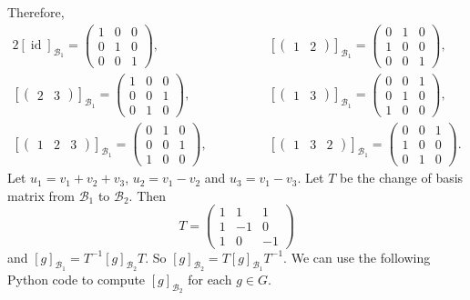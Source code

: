 \documentclass[a4paper, 12pt]{article}
\DeclareMathOperator{\id}{id}
\newcommand{\mc}[1]{\mathcal{#1}}
\begin{document}
Therefore,
\begin{alignat*}{2}
    [\id]_{\mc{B}_1} = \begin{pmatrix} 1&0&0 \\ 0&1&0 \\ 0&0&1 \end{pmatrix}, & \hspace{4em} [\begin{pmatrix} 1&2 \end{pmatrix}]_{\mc{B}_1} = \begin{pmatrix} 0&1&0 \\ 1&0&0 \\ 0&0&1 \end{pmatrix}, \\
    [\begin{pmatrix} 2&3 \end{pmatrix}]_{\mc{B}_1} = \begin{pmatrix} 1&0&0 \\ 0&0&1 \\ 0&1&0 \end{pmatrix}, & \hspace{4em} [\begin{pmatrix} 1&3 \end{pmatrix}]_{\mc{B}_1} = \begin{pmatrix} 0&0&1 \\ 0&1&0 \\ 1&0&0 \end{pmatrix}, \\
    [\begin{pmatrix} 1&2&3 \end{pmatrix}]_{\mc{B}_1} = \begin{pmatrix} 0&1&0 \\ 0&0&1 \\ 1&0&0 \end{pmatrix}, & \hspace{4em} [\begin{pmatrix} 1&3&2 \end{pmatrix}]_{\mc{B}_1} = \begin{pmatrix} 0&0&1 \\ 1&0&0 \\ 0&1&0 \end{pmatrix}.
\end{alignat*}
Let $u_1=v_1+v_2+v_3$, $u_2=v_1-v_2$ and $u_3=v_1-v_3$. Let $T$ be the change of basis matrix from $\mc{B}_1$ to $\mc{B}_2$. Then \[ T = \begin{pmatrix} 1&1&1 \\ 1&-1&0 \\ 1&0&-1 \end{pmatrix} \] and $[g]_{\mc{B}_1} = T^{-1}[g]_{\mc{B}_2}T$. So $[g]_{\mc{B}_2} = T[g]_{\mc{B}_1}T^{-1}$. We can use the following Python code to compute $[g]_{\mc{B}_2}$ for each $g \in G$.
\end{document}
